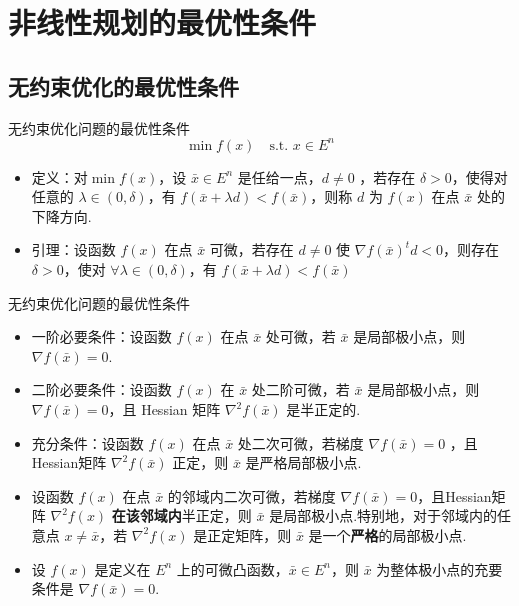 \section{非线性规划的最优性条件}
\subsection{无约束优化的最优性条件}
\begin{remark}
    无约束优化问题的最优性条件\[\min f(x) \quad \text{s.t. } x \in E^n\]
    \begin{itemize}
        \item 定义：对$\min f(x)$，设 $\bar{x} \in E^n$ 是任给一点，$d\neq 0$ ，若存在 $\delta > 0$，使得对任意的 $\lambda \in (0, \delta)$，有 $f(\bar{x} + \lambda d) < f(\bar{x})$，则称 $d$ 为 $f(x)$ 在点 $\bar{x}$ 处的下降方向.
        \item 引理：设函数 $f(x)$ 在点 $\bar{x}$ 可微，若存在 $d \neq 0$ 使 $\nabla f(\bar{x})^td < 0$，则存在 $\delta > 0$，使对 $\forall \lambda\in (0, \delta)$，有 $f(\bar{x} + \lambda d) < f(\bar{x})$
    \end{itemize}
\end{remark}

\begin{theorem}
    无约束优化问题的最优性条件\begin{itemize}
        \item 一阶必要条件：设函数 $f(x)$ 在点 $\bar{x}$ 处可微，若 $\bar{x}$ 是局部极小点，则 $\nabla f(\bar{x}) = 0$.
        \item 二阶必要条件：设函数 $f(x)$ 在 $\bar{x}$ 处二阶可微，若 $\bar{x}$ 是局部极小点，则 $\nabla f(\bar{x}) = 0$，且 Hessian 矩阵 $\nabla^2f(\bar{x})$ 是半正定的.
        \item 充分条件：设函数 $f(x)$ 在点 $\bar{x}$ 处二次可微，若梯度 $\nabla f(\bar{x}) = 0$ ，且 Hessian矩阵 $\nabla^2f(\bar{x})$ 正定，则 $\bar{x}$ 是严格局部极小点.
        \item 设函数 $f(x)$ 在点 $\bar{x}$ 的邻域内二次可微，若梯度 $\nabla f(\bar{x}) = 0$，且Hessian矩阵 $\nabla^2f(x)$ \textbf{在该邻域内}半正定，则 $\bar{x}$ 是局部极小点.特别地，对于邻域内的任意点 $x\neq \bar{x}$，若 $\nabla^2f(x)$ 是正定矩阵，则 $\bar{x}$ 是一个\textbf{严格}的局部极小点.
        \item 设 $f(x)$ 是定义在 $E^n$ 上的可微凸函数，$\bar{x} \in E^n$，则 $\bar{x}$ 为整体极小点的充要条件是 $\nabla f(\bar{x}) = 0$.
    \end{itemize}
\end{theorem}

